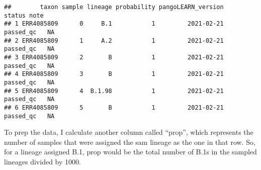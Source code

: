 \documentclass[]{article}
\newenvironment{Shaded}{\begin{snugshade}}{\end{snugshade}}
\newcommand{\CharTok}[1]{\textcolor[rgb]{0.31,0.60,0.02}{#1}}
\newcommand{\DataTypeTok}[1]{\textcolor[rgb]{0.13,0.29,0.53}{#1}}
\newcommand{\DecValTok}[1]{\textcolor[rgb]{0.00,0.00,0.81}{#1}}
\newcommand{\KeywordTok}[1]{\textcolor[rgb]{0.13,0.29,0.53}{\textbf{#1}}}
\newcommand{\NormalTok}[1]{#1}
\newcommand{\OperatorTok}[1]{\textcolor[rgb]{0.81,0.36,0.00}{\textbf{#1}}}
\newcommand{\StringTok}[1]{\textcolor[rgb]{0.31,0.60,0.02}{#1}}
\begin{document}
\begin{Shaded}
\end{Shaded}

\begin{verbatim}
##        taxon sample lineage probability pangoLEARN_version    status note
## 1 ERR4085809      0     B.1           1         2021-02-21 passed_qc   NA
## 2 ERR4085809      1     A.2           1         2021-02-21 passed_qc   NA
## 3 ERR4085809      2       B           1         2021-02-21 passed_qc   NA
## 4 ERR4085809      3       B           1         2021-02-21 passed_qc   NA
## 5 ERR4085809      4  B.1.98           1         2021-02-21 passed_qc   NA
## 6 ERR4085809      5       B           1         2021-02-21 passed_qc   NA
\end{verbatim}

To prep the data, I calculate another column called ``prop'', which
represents the number of samples that were assigned the sam lineage as
the one in that row. So, for a lineage assigned B.1, prop would be the
total number of B.1s in the sampled lineages divided by 1000.

\begin{Shaded}
\end{Shaded}
\end{document}
